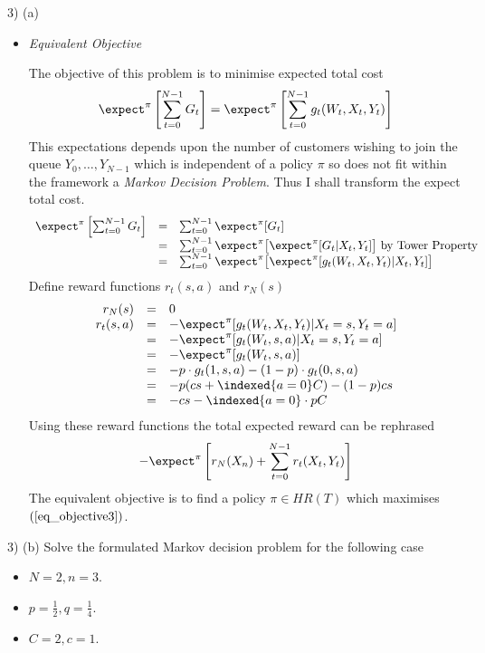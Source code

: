 \documentclass[11pt,a4paper]{article}
\begin{document}
\begin{answer}{3) (a)}
\begin{itemize}
    \item \textit{Equivalent Objective}
    \par The objective of this problem is to minimise expected total cost
    \[ \expect^\pi\left[\sum_{t=0}^{N-1}G_t\right]=\expect^\pi\left[\sum_{t=0}^{N-1}g_t(W_t,X_t,Y_t)\right] \]
    This expectations depends upon the number of customers wishing to join the queue $Y_0,\dots,Y_{N-1}$ which is independent of a policy $\pi$ so does not fit within the framework a \textit{Markov Decision Problem}. Thus I shall transform the expect total cost.
    \[\begin{array}{rcl}
      \expect^\pi\left[\sum_{t=0}^{N-1}G_t\right]&=&\sum_{t=0}^{N-1}\expect^\pi[G_t]\\
      &=&\sum_{t=0}^{N-1}\expect^\pi\big[\expect^\pi[G_t|X_t,Y_t]\big]\text{ by Tower Property}\\
      &=&\sum_{t=0}^{N-1}\expect^\pi\big[\expect^\pi[g_t(W_t,X_t,Y_t)|X_t,Y_t]\big]\\
    \end{array}\]
    Define reward functions $r_t(s,a)$ and $r_N(s)$
    \[\begin{array}{rcl}
      r_N(s)&=&0\\
      r_t(s,a)&=&-\expect^\pi[g_t(W_t,X_t,Y_t)|X_t=s,Y_t=a]\\
      &=&-\expect^\pi[g_t(W_t,s,a)|X_t=s,Y_t=a]\\
      &=&-\expect^\pi[g_t(W_t,s,a)]\\
      &=&-p\cdot g_t(1,s,a)-(1-p)\cdot g_t(0,s,a)\\
      &=&-p(cs+\indexed\{a=0\}C)-(1-p)cs\\
      &=&-cs-\indexed\{a=0\}\cdot pC
    \end{array}\]
    Using these reward functions the total expected reward can be rephrased
    \begin{equation} \label{eq_objective3}
      -\expect^\pi\left[r_N(X_n)+\sum_{t=0}^{N-1}r_t(X_t,Y_t)\right]
    \end{equation}
    The equivalent objective is to find a policy $\pi\in HR(T)$ which maximises $(\ref{eq_objective3})$.
  \end{itemize}
\end{answer}

\begin{question}{3) (b)}
  Solve the formulated Markov decision problem for the following case
  \begin{itemize}
    \item $N=2,n=3$.
    \item $p=\frac12,q=\frac14$.
    \item $C=2,c=1$.
  \end{itemize}
\end{question}
\end{document}
